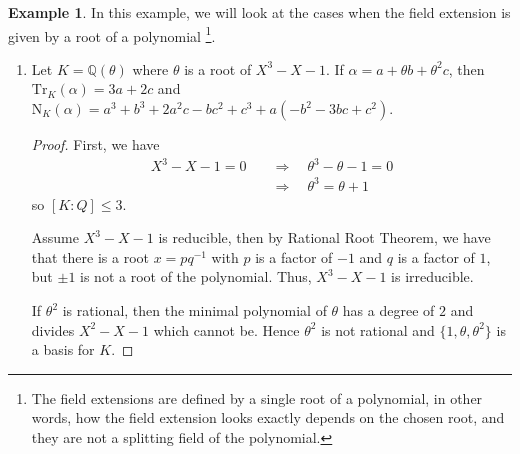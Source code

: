 \documentclass[a4paper]{book}
\theoremstyle{definition}
\newtheorem{example}{Example}[definition]
\begin{document}
\begin{example}
    In this example, we will look at the cases when the field extension is given by a root of a polynomial \footnote{The field extensions are defined by a single root of a polynomial, in other words, how the field extension looks exactly depends on the chosen root, and they are not a splitting field of the polynomial.}.
    \begin{enumerate}
        \item Let \(K = \mathbb{Q}(\theta)\) where \(\theta\) is a root of \(X^3 - X - 1\). If \(\alpha = a + \theta b + \theta^2 c\), then \(\mathrm{Tr}_K(\alpha) = 3a + 2c\) and \(\mathrm{N}_K(\alpha) = a^3 + b^3 + 2 a^2 c - b c^2 + c^3 + a (-b^2 - 3 b c + c^2)\).
        \begin{proof}
            First, we have
            \begin{align*}
                X^3 - X - 1 = 0 \quad &\Rightarrow \quad \theta^3 - \theta - 1 =0 \\
                &\Rightarrow \quad \theta^3 = \theta + 1
            \end{align*}
            so \([K:Q] \leq 3\).
            
            Assume \(X^3 - X - 1\) is reducible, then by Rational Root Theorem, we have that there is a root \(x = pq^{-1}\) with \(p\) is a factor of \(-1\) and \(q\) is a factor of \(1\), but \(\pm 1\) is not a root of the polynomial. Thus, \(X^3 - X - 1\) is irreducible.

            If \(\theta^2\) is rational, then the minimal polynomial of \(\theta\) has a degree of \(2\) and divides \(X^2 - X - 1\) which cannot be. Hence \(\theta^2\) is not rational and \(\{1, \theta, \theta^2\}\) is a basis for \(K\).


\end{proof}
\end{enumerate}
\end{example}
\end{document}
